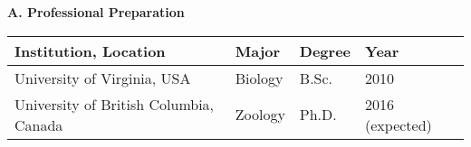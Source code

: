 \renewcommand{\thepage}{Biographical Sketch  - Page \arabic{page} of 2}

\begin{comment}
Biographical Sketch [2 page limit]. Submit your CV in the section Biographical Sketches. Follow the
form in the Grants Program Guide II.C.2.f.i for senior personnel. List conference abstracts and titles of
presentations separately from peer--?reviewed articles. For unpublished manuscripts, list only those
submitted or accepted for publication (along with most likely date of publication).
\end{comment}





\setcounter{page}{1}
\renewcommand{\thepage}{Biographical Sketch - Page \arabic{page} of 2}


\textbf{A.  Professional Preparation}
\vspace{2pt}	

\begin{tabular}{llll}
Institution, Location \hspace{0.5in} & Major \hspace{1in} & Degree  \hspace{0.25in} & Year \\
\hline
University of Virginia, USA  & Biology  & B.Sc.   & 2010 \\
University of British Columbia, Canada                     & Zoology              & Ph.D.                  & 2016 (expected) \\
\end{tabular}


